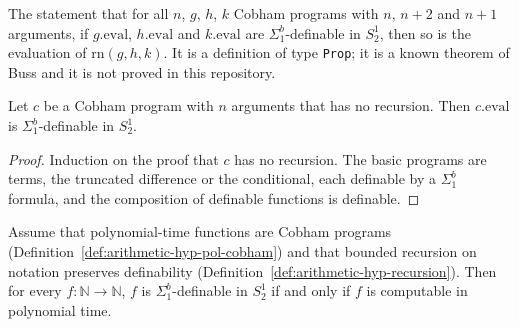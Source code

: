 \begin{definition}
  \label{def:arithmetic-hyp-recursion}
  \leanok
  The statement that for all $n$, $g$, $h$, $k$ Cobham programs with $n$, $n + 2$ and $n + 1$
  arguments, if $g.\mathrm{eval}$, $h.\mathrm{eval}$ and $k.\mathrm{eval}$ are $\Sigma^b_1$-definable
  in $S^1_2$, then so is the evaluation of $\mathrm{rn}(g, h, k)$. It is a definition of type
  \texttt{Prop}; it is a known theorem of Buss and it is not proved in this repository.
\end{definition}

\begin{theorem}
  \label{thm:arithmetic-sinrn-definable}
  \leanok
  Let $c$ be a Cobham program with $n$ arguments that has no recursion. Then $c.\mathrm{eval}$ is
  $\Sigma^b_1$-definable in $S^1_2$.
\end{theorem}

\begin{proof}
  \leanok
  Induction on the proof that $c$ has no recursion. The basic programs are terms, the truncated
  difference or the conditional, each definable by a $\Sigma^b_1$ formula, and the composition of
  definable functions is definable.
\end{proof}

\begin{theorem}
  \label{thm:arithmetic-buss}
  \leanok
  Assume that polynomial-time functions are Cobham programs (Definition~\ref{def:arithmetic-hyp-pol-cobham})
  and that bounded recursion on notation preserves definability
  (Definition~\ref{def:arithmetic-hyp-recursion}). Then for every $f : \mathbb{N} \to \mathbb{N}$, $f$
  is $\Sigma^b_1$-definable in $S^1_2$ if and only if $f$ is computable in polynomial time.
\end{theorem}

